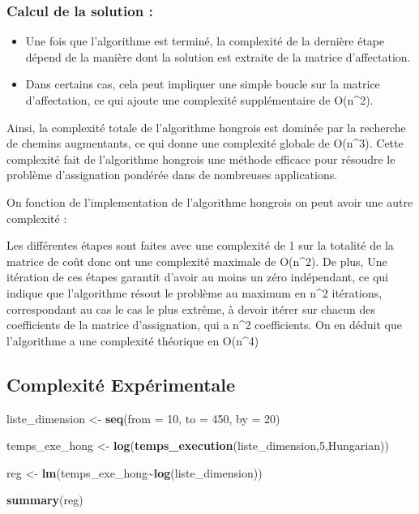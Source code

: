 \documentclass[
]{article}
\newenvironment{Shaded}{\begin{snugshade}}{\end{snugshade}}
\newcommand{\AttributeTok}[1]{\textcolor[rgb]{0.13,0.29,0.53}{#1}}
\newcommand{\DecValTok}[1]{\textcolor[rgb]{0.00,0.00,0.81}{#1}}
\newcommand{\FunctionTok}[1]{\textcolor[rgb]{0.13,0.29,0.53}{\textbf{#1}}}
\newcommand{\NormalTok}[1]{#1}
\newcommand{\OtherTok}[1]{\textcolor[rgb]{0.56,0.35,0.01}{#1}}
\newcommand{\SpecialCharTok}[1]{\textcolor[rgb]{0.81,0.36,0.00}{\textbf{#1}}}
\providecommand{\tightlist}{%
  \setlength{\itemsep}{0pt}\setlength{\parskip}{0pt}}
\begin{document}
\hypertarget{calcul-de-la-solution}{%
\subsubsection{Calcul de la solution :}\label{calcul-de-la-solution}}

\begin{itemize}
\tightlist
\item
  Une fois que l'algorithme est terminé, la complexité de la dernière
  étape dépend de la manière dont la solution est extraite de la matrice
  d'affectation.
\item
  Dans certains cas, cela peut impliquer une simple boucle sur la
  matrice d'affectation, ce qui ajoute une complexité supplémentaire de
  O(n\^{}2).
\end{itemize}

Ainsi, la complexité totale de l'algorithme hongrois est dominée par la
recherche de chemins augmentants, ce qui donne une complexité globale de
O(n\^{}3). Cette complexité fait de l'algorithme hongrois une méthode
efficace pour résoudre le problème d'assignation pondérée dans de
nombreuses applications.

On fonction de l'implementation de l'algorithme hongrois on peut avoir
une autre complexité :

Les différentes étapes sont faites avec une complexité de 1 sur la
totalité de la matrice de coût donc ont une complexité maximale de
O(n\^{}2). De plus, Une itération de ces étapes garantit d'avoir au
moins un zéro indépendant, ce qui indique que l'algorithme résout le
problème au maximum en n\^{}2 itérations, correspondant au cas le cas le
plus extrême, à devoir itérer sur chacun des coefficients de la matrice
d'assignation, qui a n\^{}2 coefficients. On en déduit que l'algorithme
a une complexité théorique en O(n\^{}4)

\hypertarget{complexituxe9-expuxe9rimentale}{%
\subsection{Complexité
Expérimentale}\label{complexituxe9-expuxe9rimentale}}

\begin{Shaded}
\begin{Highlighting}[]
\NormalTok{liste\_dimension }\OtherTok{\textless{}{-}} \FunctionTok{seq}\NormalTok{(}\AttributeTok{from =} \DecValTok{10}\NormalTok{, }\AttributeTok{to =} \DecValTok{450}\NormalTok{, }\AttributeTok{by =} \DecValTok{20}\NormalTok{)}

\NormalTok{temps\_exe\_hong }\OtherTok{\textless{}{-}} \FunctionTok{log}\NormalTok{(}\FunctionTok{temps\_execution}\NormalTok{(liste\_dimension,}\DecValTok{5}\NormalTok{,Hungarian))}

\NormalTok{reg }\OtherTok{\textless{}{-}} \FunctionTok{lm}\NormalTok{(temps\_exe\_hong}\SpecialCharTok{\textasciitilde{}}\FunctionTok{log}\NormalTok{(liste\_dimension))}

\FunctionTok{summary}\NormalTok{(reg)}
\end{Highlighting}
\end{Shaded}
\end{document}
